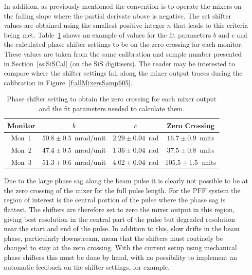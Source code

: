 In addition, as previously mentioned the convention is to operate the mixers on the falling slope where the partial derivate above is negative. The set shifter values are obtained using the smallest positive integer \(n\) that leads to this criteria being met. Table~\ref{t:calZeroCross} shows an example of values for the fit parameters \(b\) and \(c\) and the calculated phase shifter settings to be on the zero crossing for each monitor. These values are taken from the same calibration and sample number presented in Section~\ref{ss:SiSCal} (on the SiS digitisers). The reader may be interested to compare where the shifter settings fall along the mixer output traces during the calibration in Figure~\ref{f:allMixersSamp605}.

\begin{table}
  \begin{center}
    \begin{tabular}{|c c c c|}
	   \hline
       Monitor & \(b\) & \(c\) & Zero Crossing \\ \hline
       Mon~1 & \(50.8\pm0.5\)~mrad/unit & \(2.29\pm0.04\)~rad & \(16.7\pm0.9\)~units \\ 
       Mon~2 & \(47.4\pm0.5\)~mrad/unit & \(1.36\pm0.04\)~rad & \(37.5\pm0.8\)~units \\
       Mon~3 & \(51.3\pm0.6\)~mrad/unit & \(4.02\pm0.04\)~rad & \(105.5\pm1.5\)~units \\ \hline
    \end{tabular}
    \caption{Phase shifter setting to obtain the zero crossing for each mixer output and the fit parameters needed to calculate them.}
  	\label{t:calZeroCross}
  \end{center}
\end{table}

Due to the large phase sag along the beam pulse it is clearly not possible to be at the zero crossing of the mixer for the full pulse length. For the PFF system the region of interest is the central portion of the pulse where the phase sag is flattest. The shifters are therefore set to zero the mixer output in this region, giving best resolution in the central part of the pulse but degraded resolution near the start and end of the pulse. In addition to this, slow drifts in the beam phase, particularly downstream, mean that the shifters must routinely be changed to stay at the zero crossing. With the current setup using mechanical phase shifters this must be done by hand, with no possibility to implement an automatic feedback on the shifter settings, for example.



